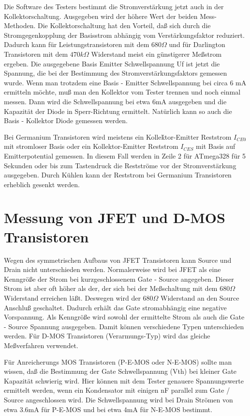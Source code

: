Die Software des Testers bestimmt die Stromverstärkung jetzt auch in der Kollektorschaltung.
Ausgegeben wird der höhere Wert der beiden Mess-Methoden.
Die Kollektorschaltung hat den Vorteil, daß sich durch die Stromgegenkopplung der Basisstrom abhängig vom
Verstärkungsfaktor reduziert. Dadurch kann für Leistungstransistoren mit dem \(680 \Omega\) und für Darlington Transistoren
mit dem \(470 k\Omega\) Widerstand meist ein günstigerer Meßstrom ergeben.
Die ausgegebene Basis Emitter Schwellspannung Uf ist jetzt die Spannung,
die bei der Bestimmung des Stromverstärkungsfaktors gemessen wurde.
Wenn man trotzdem eine Basis - Emitter Schwellspannung bei circa 6 mA ermitteln möchte, muß man den Kollektor
vom Tester trennen und noch einmal messen.
Dann wird die Schwellspannung bei etwa 6mA ausgegeben und die Kapazität der Diode in Sperr-Richtung ermittelt.
Natürlich kann so auch die Basis - Kollektor Diode gemessen werden.

Bei Germanium Transistoren wird meistens ein Kolleḱtor-Emitter Reststrom \(I_{CE0}\) mit stromloser Basis oder
ein Kollektor-Emitter Reststrom \(I_{CES}\) mit Basis auf Emitterpotential gemessen.
In diesem Fall werden in Zeile 2 für ATmega328 für 5 Sekunden oder bis zum Tastendruck die Restströme
vor der Stromverstärkung ausgegeben.
Durch Kühlen kann der Reststrom bei Germanium Transistoren erheblich gesenkt werden. 

\section{Messung von JFET und D-MOS Transistoren}
Wegen des symmetrischen Aufbaus von JFET Transistoren kann Source und Drain nicht unterschieden werden.
Normalerweise wird bei JFET als eine Kenngröße der Strom bei kurzgeschlossenem Gate - Source angegeben.
Dieser Strom ist aber oft höher als der, der sich bei der Meßschaltung mit dem \(680 \Omega\) Widerstand erreichen läßt.
Deswegen wird der \(680 \Omega\) Widerstand an den Source Anschluß geschaltet. Dadurch erhält das Gate
stromabhängig eine negative Vorspannung. Als Kenngröße wird sowohl der ermittelte Strom als auch die
Gate - Source Spannung ausgegeben. 
Damit können verschiedene Typen unterschieden werden.
Für D-MOS Transistoren (Verarmungs-Typ) wird das gleiche Meßverfahren verwendet.

Für Anreicherungs MOS Transistoren (P-E-MOS oder N-E-MOS) sollte man wissen, daß die Bestimmung der Gate Schwellspannung (Vth)
bei kleiner Gate  Kapazität schwierig wird. Hier können mit dem Tester genauere Spannungswerte ermittelt werden, wenn ein
Kondensator mit einigen nF parallel zum Gate / Source angeschlossen wird.
Die Schwellspannung wird bei Drain Strömen von etwa 3.6mA für P-E-MOS und bei etwa 4mA für N-E-MOS bestimmt.
